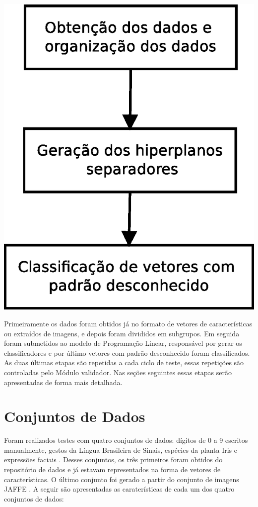\begin{center}
	\includegraphics[scale=0.5]{graficos/diagrama_modulos}
	\label{img:diagrama_modulos}
\end{center}

Primeiramente os dados foram obtidos já no formato de vetores de características ou extraídos de imagens, e depois foram divididos em subgrupos. Em seguida foram submetidos ao modelo de Programação Linear, responsável por gerar os classificadores e por último vetores com padrão desconhecido foram classificados. As duas últimas etapas são repetidas a cada ciclo de teste, essas repetições são controladas pelo Módulo validador. Nas seções seguintes essas etapas serão apresentadas de forma mais detalhada.

\section{Conjuntos de Dados}
Foram realizados testes com quatro conjuntos de dados: dígitos de 0 a 9 escritos manualmente, gestos da Língua Brasileira de Sinais, espécies da planta Iris e expressões faciais . Desses conjuntos, os três primeiros foram obtidos do repositório de dados  e já estavam representados na forma de vetores de características. O último conjunto foi gerado a partir do conjunto de imagens JAFFE \cite{Jaffe}. A seguir são apresentadas as caraterísticas de cada um dos quatro conjuntos de dados:

